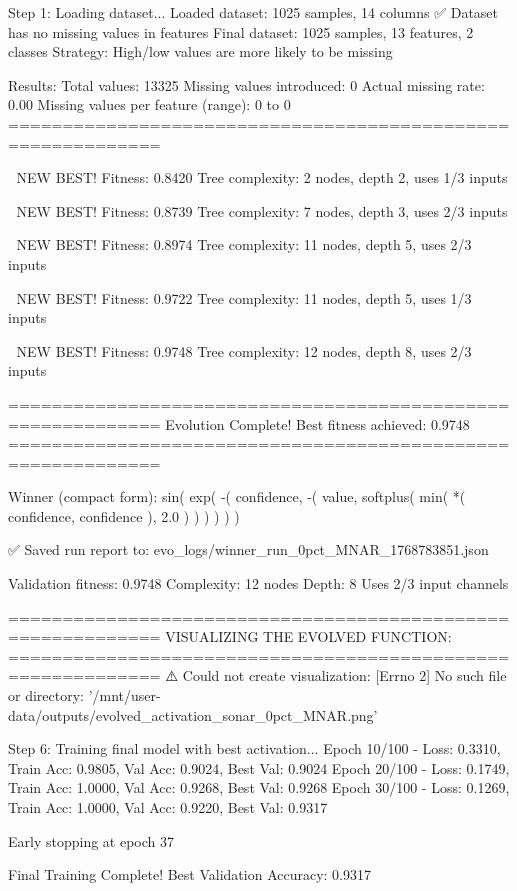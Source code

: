 Step 1: Loading dataset...
Loaded dataset: 1025 samples, 14 columns
✅ Dataset has no missing values in features
Final dataset: 1025 samples, 13 features, 2 classes
Strategy: High/low values are more likely to be missing

Results:
  Total values: 13325
  Missing values introduced: 0
  Actual missing rate: 0.00%
  Missing values per feature (range): 0 to 0
============================================================


🎯 NEW BEST! Fitness: 0.8420
Tree complexity: 2 nodes, depth 2, uses 1/3 inputs

🎯 NEW BEST! Fitness: 0.8739
Tree complexity: 7 nodes, depth 3, uses 2/3 inputs

🎯 NEW BEST! Fitness: 0.8974
Tree complexity: 11 nodes, depth 5, uses 2/3 inputs

🎯 NEW BEST! Fitness: 0.9722
Tree complexity: 11 nodes, depth 5, uses 1/3 inputs

🎯 NEW BEST! Fitness: 0.9748
Tree complexity: 12 nodes, depth 8, uses 2/3 inputs

============================================================
Evolution Complete!
Best fitness achieved: 0.9748
============================================================

Winner (compact form):
 sin(
  exp(
    -(
      confidence,
      -(
        value,
        softplus(
          min(
            *(
              confidence,
              confidence
            ),
            2.0
          )
        )
      )
    )
  )
)

✅ Saved run report to: evo_logs/winner_run_0pct_MNAR_1768783851.json

Validation fitness: 0.9748
Complexity: 12 nodes
Depth: 8
Uses 2/3 input channels

============================================================
VISUALIZING THE EVOLVED FUNCTION:
============================================================
⚠️ Could not create visualization: [Errno 2] No such file or directory: '/mnt/user-data/outputs/evolved_activation_sonar_0pct_MNAR.png'

Step 6: Training final model with best activation...
Epoch  10/100 - Loss: 0.3310, Train Acc: 0.9805, Val Acc: 0.9024, Best Val: 0.9024
Epoch  20/100 - Loss: 0.1749, Train Acc: 1.0000, Val Acc: 0.9268, Best Val: 0.9268
Epoch  30/100 - Loss: 0.1269, Train Acc: 1.0000, Val Acc: 0.9220, Best Val: 0.9317

Early stopping at epoch 37

Final Training Complete!
Best Validation Accuracy: 0.9317

